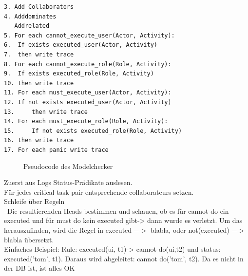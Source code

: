 \begin{verbatim}
3. Add Collaborators
4. Adddominates
   Addrelated
5. For each cannot_execute_user(Actor, Activity): 
6.	If exists executed_user(Actor, Activity) 
7. 	then write trace
8. For each cannot_execute_role(Role, Activity):
9. 	If exists executed_role(Role, Activity)
10.	then write trace
11. For each must_execute_user(Actor, Activity): 
12.	If not exists executed_user(Actor, Activity) 
13. 	then write trace
14. For each must_execute_role(Role, Activity):
15. 	If not exists executed_role(Role, Activity)
16.	then write trace
17. For each panic write trace
\end{verbatim}
\begin{figure}[!h]
\caption{Pseudocode des Modelchecker}
\label{fig:pseudocode}
\end{figure}

Zuerst aus Logs Status-Prädikate auslesen.\\
Für jedes critical task pair entsprechende collaborateurs setzen.\\
Schleife über Regeln\\
--Die resultierenden Heads bestimmen und schauen, ob es für cannot do ein executed und für must do kein executed gibt-> dann wurde es verletzt. Um das herauszufinden, wird die Regel in executed $ - >$ blabla, oder not(executed) $- >$ blabla übersetzt.\\
 
Einfaches Beispiel: Rule: executed(ui, t1)-> cannot do(ui,t2) und status: executed('tom', t1). Daraus wird abgeleitet: cannot do('tom', t2). Da es nicht in der DB ist, ist alles OK
